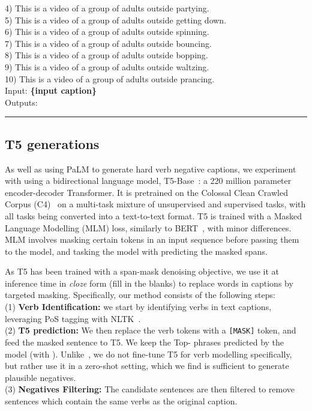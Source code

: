 { 4) This is a video of a group of adults outside partying. \\
 5) This is a video of a group of adults outside getting down. \\
 6) This is a video of a group of adults outside spinning. \\
 7) This is a video of a group of adults outside bouncing. \\
 8) This is a video of a group of adults outside bopping.\\
 9) This is a video of a group of adults outside waltzing. \\
 10) This is a video of a group of adults outside prancing.\\
Input: \textbf{\{input caption\}}\\
Outputs: \\}
\noindent\rule{8.5cm}{0.4pt}

\subsection{T5 generations}\label{subsec:app:t5}

As well as using PaLM to generate hard verb negative captions, we experiment with using  a bidirectional language model, T5-Base~\cite{2020t5}: a 220 million parameter encoder-decoder Transformer. 
It is pretrained on the Colossal Clean Crawled Corpus (C4)~\cite{palm} on a multi-task mixture of unsupervised and supervised tasks, with all tasks being converted into a text-to-text format. 
T5 is trained with a Masked Language Modelling (MLM) loss, similarly to BERT~\cite{devlin-etal-2019-bert}, with minor differences. 
MLM involves masking certain tokens in an input sequence before passing them to the model, and tasking the model with predicting the masked spans. 

As T5 has been trained with a span-mask denoising objective, we use it at inference time in \textit{cloze} form (fill in the blanks) to replace words in captions by targeted masking. 
Specifically, our method consists of the following steps: \\ 
(1) \textbf{Verb Identification:} we start by identifying verbs in text captions, leveraging PoS tagging with NLTK~\cite{bird2009natural}. \\
(2) \textbf{T5 prediction:}
We then replace the verb tokens with a \texttt{[MASK]} token, and feed the masked sentence to T5. We keep the Top- phrases predicted by the model (with ). 
Unlike~\cite{park-etal-2022-exposing}, we do not fine-tune T5 for verb modelling specifically, but rather use it in a zero-shot setting, which we find is sufficient to generate plausible negatives. \\
(3) \textbf{Negatives Filtering:}
The  candidate sentences are then filtered to remove sentences which contain the same verbs as the original caption.

